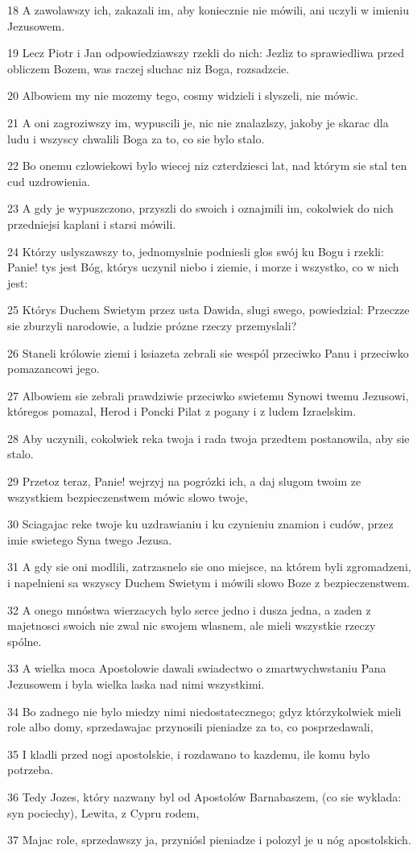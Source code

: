 \par 18 A zawolawszy ich, zakazali im, aby koniecznie nie mówili, ani uczyli w imieniu Jezusowem.
\par 19 Lecz Piotr i Jan odpowiedziawszy rzekli do nich: Jezliz to sprawiedliwa przed obliczem Bozem, was raczej sluchac niz Boga, rozsadzcie.
\par 20 Albowiem my nie mozemy tego, cosmy widzieli i slyszeli, nie mówic.
\par 21 A oni zagroziwszy im, wypuscili je, nic nie znalazlszy, jakoby je skarac dla ludu i wszyscy chwalili Boga za to, co sie bylo stalo.
\par 22 Bo onemu czlowiekowi bylo wiecej niz czterdziesci lat, nad którym sie stal ten cud uzdrowienia.
\par 23 A gdy je wypuszczono, przyszli do swoich i oznajmili im, cokolwiek do nich przedniejsi kaplani i starsi mówili.
\par 24 Którzy uslyszawszy to, jednomyslnie podniesli glos swój ku Bogu i rzekli: Panie! tys jest Bóg, którys uczynil niebo i ziemie, i morze i wszystko, co w nich jest:
\par 25 Którys Duchem Swietym przez usta Dawida, slugi swego, powiedzial: Przeczze sie zburzyli narodowie, a ludzie prózne rzeczy przemyslali?
\par 26 Staneli królowie ziemi i ksiazeta zebrali sie wespól przeciwko Panu i przeciwko pomazancowi jego.
\par 27 Albowiem sie zebrali prawdziwie przeciwko swietemu Synowi twemu Jezusowi, któregos pomazal, Herod i Poncki Pilat z pogany i z ludem Izraelskim.
\par 28 Aby uczynili, cokolwiek reka twoja i rada twoja przedtem postanowila, aby sie stalo.
\par 29 Przetoz teraz, Panie! wejrzyj na pogrózki ich, a daj slugom twoim ze wszystkiem bezpieczenstwem mówic slowo twoje,
\par 30 Sciagajac reke twoje ku uzdrawianiu i ku czynieniu znamion i cudów, przez imie swietego Syna twego Jezusa.
\par 31 A gdy sie oni modlili, zatrzasnelo sie ono miejsce, na którem byli zgromadzeni, i napelnieni sa wszyscy Duchem Swietym i mówili slowo Boze z bezpieczenstwem.
\par 32 A onego mnóstwa wierzacych bylo serce jedno i dusza jedna, a zaden z majetnosci swoich nie zwal nic swojem wlasnem, ale mieli wszystkie rzeczy spólne.
\par 33 A wielka moca Apostolowie dawali swiadectwo o zmartwychwstaniu Pana Jezusowem i byla wielka laska nad nimi wszystkimi.
\par 34 Bo zadnego nie bylo miedzy nimi niedostatecznego; gdyz którzykolwiek mieli role albo domy, sprzedawajac przynosili pieniadze za to, co posprzedawali,
\par 35 I kladli przed nogi apostolskie, i rozdawano to kazdemu, ile komu bylo potrzeba.
\par 36 Tedy Jozes, który nazwany byl od Apostolów Barnabaszem, (co sie wyklada: syn pociechy), Lewita, z Cypru rodem,
\par 37 Majac role, sprzedawszy ja, przyniósl pieniadze i polozyl je u nóg apostolskich.

